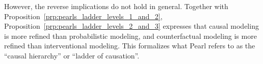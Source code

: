 However, the reverse implications do not hold in general. 
Together with Proposition~\ref{prp:pearls_ladder_levels_1_and_2}, Proposition~\ref{prp:pearls_ladder_levels_2_and_3} 
expresses that causal modeling is more refined than 
probabilistic modeling, and counterfactual modeling is more refined than interventional modeling.
This formalizes what Pearl refers to as the ``causal hierarchy'' or ``ladder of causation''.


